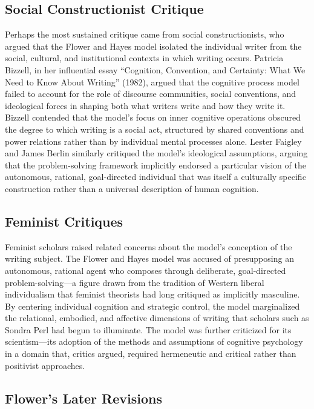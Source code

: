 \documentclass[12pt]{article}
\begin{document}
\subsection{Social Constructionist Critique}

Perhaps the most sustained critique came from social constructionists, who argued that the Flower and Hayes model isolated the individual writer from the social, cultural, and institutional contexts in which writing occurs. Patricia Bizzell, in her influential essay ``Cognition, Convention, and Certainty: What We Need to Know About Writing'' (1982), argued that the cognitive process model failed to account for the role of discourse communities, social conventions, and ideological forces in shaping both what writers write and how they write it. Bizzell contended that the model's focus on inner cognitive operations obscured the degree to which writing is a social act, structured by shared conventions and power relations rather than by individual mental processes alone. Lester Faigley and James Berlin similarly critiqued the model's ideological assumptions, arguing that the problem-solving framework implicitly endorsed a particular vision of the autonomous, rational, goal-directed individual that was itself a culturally specific construction rather than a universal description of human cognition.

\subsection{Feminist Critiques}

Feminist scholars raised related concerns about the model's conception of the writing subject. The Flower and Hayes model was accused of presupposing an autonomous, rational agent who composes through deliberate, goal-directed problem-solving---a figure drawn from the tradition of Western liberal individualism that feminist theorists had long critiqued as implicitly masculine. By centering individual cognition and strategic control, the model marginalized the relational, embodied, and affective dimensions of writing that scholars such as Sondra Perl had begun to illuminate. The model was further criticized for its scientism---its adoption of the methods and assumptions of cognitive psychology in a domain that, critics argued, required hermeneutic and critical rather than positivist approaches.

\subsection{Flower's Later Revisions}
\end{document}
